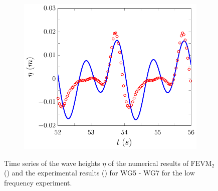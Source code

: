 \begin{figure}
\begin{subfigure}{0.5\textwidth}
		\vspace{0.5cm}
	\end{subfigure}
	\begin{subfigure}{0.5\textwidth}
		\includegraphics[width=\textwidth]{./chp6/figures/Experiment/Beji/sl/FEVMWG7.pdf}
		\vspace{0.5cm}
	\end{subfigure}
	\caption{Time series of the wave heights $\eta$ of the numerical results of $\text{FEVM}_2$ ({\color{blue}\solidrule}) and the experimental results () for WG5 - WG7 for the low frequency experiment.}
	\label{fig:BejislWG5to7FEVM}
\end{figure}
%
